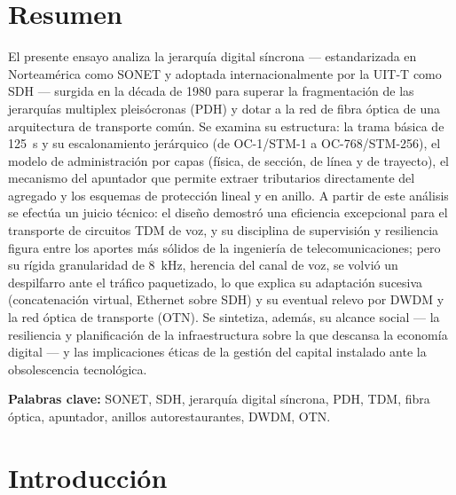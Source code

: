 \documentclass[12pt,a4paper]{article}
\begin{document}
\section{Resumen}

El presente ensayo analiza la jerarquía digital síncrona --- estandarizada en Norteamérica como SONET y adoptada internacionalmente por la UIT-T como SDH --- surgida en la década de 1980 para superar la fragmentación de las jerarquías multiplex pleisócronas (PDH) y dotar a la red de fibra óptica de una arquitectura de transporte común. Se examina su estructura: la trama básica de 125~\textmu s y su escalonamiento jerárquico (de OC-1/STM-1 a OC-768/STM-256), el modelo de administración por capas (física, de sección, de línea y de trayecto), el mecanismo del apuntador que permite extraer tributarios directamente del agregado y los esquemas de protección lineal y en anillo. A partir de este análisis se efectúa un juicio técnico: el diseño demostró una eficiencia excepcional para el transporte de circuitos TDM de voz, y su disciplina de supervisión y resiliencia figura entre los aportes más sólidos de la ingeniería de telecomunicaciones; pero su rígida granularidad de 8~kHz, herencia del canal de voz, se volvió un despilfarro ante el tráfico paquetizado, lo que explica su adaptación sucesiva (concatenación virtual, Ethernet sobre SDH) y su eventual relevo por DWDM y la red óptica de transporte (OTN). Se sintetiza, además, su alcance social --- la resiliencia y planificación de la infraestructura sobre la que descansa la economía digital --- y las implicaciones éticas de la gestión del capital instalado ante la obsolescencia tecnológica.

\noindent\textbf{Palabras clave:} SONET, SDH, jerarquía digital síncrona, PDH, TDM, fibra óptica, apuntador, anillos autorestaurantes, DWDM, OTN.

\section{Introducción}
\end{document}
